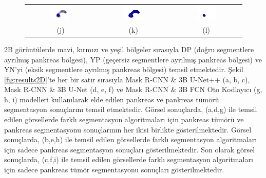 \begin{figure}[h!]
\begin{center}
{\begin{tabular}{ccc}
				\includegraphics[width=0.3\textwidth]{Bulgular-Irdeleme/Figures/fcn3dmix.png} & \includegraphics[width=0.3\textwidth]{Bulgular-Irdeleme/Figures/fcn3dpan.png} & \includegraphics[width=0.3\textwidth]{Bulgular-Irdeleme/Figures/fcn3dtum.png} \\
				(j) & (k) & (l)
			\end{tabular}
		}
	\end{center}
\end{figure}


2B görüntülerde mavi, kırmızı ve yeşil bölgeler sırasıyla DP (doğru segmentlere ayrılmış pankreas bölgesi), YP (geçersiz segmentlere ayrılmış pankreas bölgesi) ve YN'yi (eksik segmentlere ayrılmış pankreas bölgesi) temsil etmektedir. Şekil \ref{fig:results2D}'te her bir satır sırasıyla Mask R-CNN \& 3B U-Net++ (a, b, c), Mask R-CNN \& 3B U-Net (d, e, f) ve Mask R-CNN \& 3B FCN Oto Kodlayıcı (g, h, i) modelleri kullanılarak elde edilen pankreas ve pankreas tümörü segmentasyon sonuçlarını temsil etmektedir. Görsel sonuçlarda, (a,d,g) ile temsil edilen görsellerde farklı segmentasyon algoritmaları için pankreas tümörü ve pankreas segmentasyonu sonuçlarının her ikisi birlikte gösterilmektedir. Görsel sonuçlarda, (b,e,h) ile temsil edilen görsellerde farklı segmentasyon algoritmaları için sadece pankreas segmentasyon sonuçları gösterilmektedir. Son olarak görsel sonuçlarda, (c,f,i) ile temsil edilen görsellerde farklı segmentasyon algoritmaları için sadece pankreas tümör segmentasyonu sonuçları gösterilmektedir.

